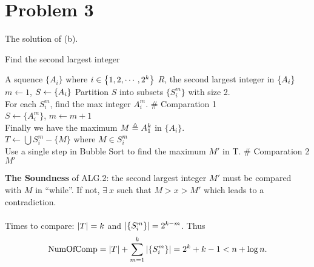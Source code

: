 \documentclass{article}
\begin{document}
\newpage
\section*{Problem 3}
The solution of (b).
\begin{algorithm}[H]
	\caption{Find the second largest integer}
	\begin{algorithmic}
		\renewcommand{\algorithmicrequire}{\textbf{Input:}}
		\renewcommand{\algorithmicensure}{\textbf{Output:}}
		\REQUIRE A squence $\{A_i\}$ where $i\in\qty{1,2, \cdots,2^k}$
		\ENSURE $R$, the second largest integer in $\qty{A_i}$\\[5pt]
		\STATE $m\gets 1$, $S\gets \qty{A_i}$
		\STATE Partition $S$ into subsets $\{S_i^{m}\}$ with size 2.\\[3pt]
		\STATE For each $S^m_i$, find the max integer $A^{m}_i$. \# Comparation 1\\[3pt]
		\STATE $S\gets\{A^m_i\}$, $m\gets m+1$\\[3pt]
		\ENDWHILE
		\STATE Finally we have the maximum $M\triangleq A^k_1$ in $\{A_i\}$.\\[3pt]
		\STATE $T\gets \bigcup S^m_i-\{M\}$ where  $M\in S^m_i$\\[3pt]
		\STATE Use a single step in Bubble Sort to find the maximum $M'$ in T. \# Comparation 2\\[3pt]
		\RETURN $M'$
	\end{algorithmic}
\end{algorithm}
\textbf{The Soundness} of ALG.2: the second largest integer $M'$ must be compared with $M$ in ``while''. If not,  $\exists\ x$ such that $M>x>M'$ which leads to a contradiction.
\\\\
Times to compare: $\qty|T|=k$ and  $\qty|\qty{S^m_i}|=2^{k-m}$. Thus
\[
	\mathrm{NumOfComp}=\qty|T|+\sum_{m=1}^k\qty|\qty{S^m_i}|=2^k+k-1<n+\log n
.\] 
\end{document}

